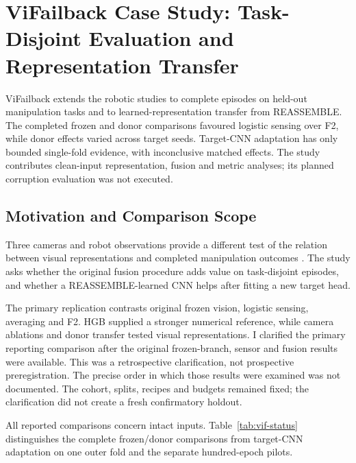 \chapter{ViFailback Case Study: Task-Disjoint Evaluation and Representation Transfer}
\label{ch:vifailback}

ViFailback extends the robotic studies to complete episodes on held-out manipulation
tasks and to learned-representation transfer from REASSEMBLE. The completed frozen and
donor comparisons favoured logistic sensing over F2, while donor effects varied across
target seeds. Target-CNN adaptation has only bounded single-fold evidence, with
inconclusive matched effects. The study contributes clean-input representation, fusion
and metric analyses; its planned corruption evaluation was not executed.

\section{Motivation and Comparison Scope}
Three cameras and robot observations provide a different test of the relation between
visual representations and completed manipulation outcomes \parencite{Zeng2026ViFailback}.
The study asks whether the original fusion procedure adds value on task-disjoint
episodes, and whether a REASSEMBLE-learned CNN helps after fitting a new target head.

The primary replication contrasts original frozen vision, logistic sensing, averaging
and F2. HGB supplied a stronger numerical reference, while camera ablations and donor
transfer tested visual representations. I clarified the primary reporting comparison after the original frozen-branch,
sensor and fusion results were available. This was a retrospective clarification,
not prospective preregistration. The precise order in which those results were
examined was not documented. The cohort, splits, recipes and budgets remained fixed;
the clarification did not create a fresh confirmatory holdout.

All reported comparisons concern intact inputs. Table~\ref{tab:vif-status} distinguishes
the complete frozen/donor comparisons from target-CNN adaptation on one outer fold and
the separate hundred-epoch pilots.


